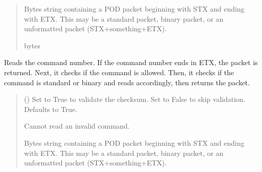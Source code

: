 \documentclass[letterpaper,10pt,english]{sphinxmanual}
\begin{document}
\begin{fulllineitems}
\begin{fulllineitems}
\begin{quote}
\begin{description}
\begin{itemize}
\end{itemize}

\sphinxAtStartPar
Bytes string containing a POD packet beginning with STX and ending with ETX. This may                 be a standard packet, binary packet, or an unformatted packet (STX+something+ETX).

\sphinxAtStartPar
bytes

\end{description}\end{quote}

\end{fulllineitems}


\begin{fulllineitems}
\label{\detokenize{BasicPodProtocol:BasicPodProtocol.POD_Basics._ReadPODpacket_Recursive}}
\pysigstartsignatures
{}
\pysigstopsignatures
\sphinxAtStartPar
Reads the command number. If the command number ends in ETX, the packet is returned.         Next, it checks if the command is allowed. Then, it checks if the command is standard or         binary and reads accordingly, then returns the packet.
\begin{quote}\begin{description}
\sphinxAtStartPar
{} (\sphinxstyleliteralemphasis{\sphinxupquote{, }}) \textendash{} Set to True to validate the checksum. Set to False to                 skip validation. Defaults to True.

\sphinxAtStartPar
{} \textendash{} Cannot read an invalid command.

\sphinxAtStartPar
Bytes string containing a POD packet beginning with STX and ending with ETX. This may                 be a standard packet, binary packet, or an unformatted packet (STX+something+ETX).


\end{description}
\end{quote}
\end{fulllineitems}
\end{fulllineitems}
\end{document}
